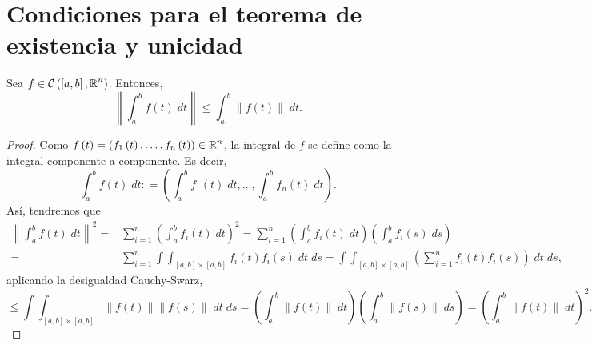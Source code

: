 \section{Condiciones para el teorema de existencia y unicidad}
\begin{lema}
	Sea $\displaystyle f \in \mathcal{C}\left(\left[a,b\right] , \mathbb{R}^{n}\right) $. Entonces,
	\[ \left\|\int^{b}_{a} f\left(t\right) \; dt\right\| \leq \int^{b}_{a} \|f\left(t\right)\| \; dt.\]
\end{lema}
\begin{proof}
Como $\displaystyle f\left(t\right)=\left(f_{1}\left(t\right), \ldots, f_{n}\left(t\right)\right)\in \mathbb{R}^{n} $, la integral de $\displaystyle f $ se define como la integral componente a componente. Es decir, 
\[\int^{b}_{a} f\left(t\right) \; dt : = \left(\int^{b}_{a} f_{1}\left(t\right) \; dt, \ldots, \int^{b}_{a} f_{n}\left(t\right) \; dt\right) .\]
Así, tendremos que 
\[
\begin{split}
	\left\|\int^{b}_{a} f\left(t\right) \; dt\right\|^{2} = & \sum^{n}_{i = 1}\left(\int^{b}_{a} f_{i}\left(t\right) \; dt\right)^{2} = \sum^{n}_{i = 1}\left(\int^{b}_{a} f_{i}\left(t\right) \; dt\right)\left(\int^{b}_{a} f_{i}\left(s\right) \; d s\right)\\
	= & \sum^{n}_{i = 1}\int \int _{\left[a,b\right]\times\left[a,b\right]}f_{i}\left(t\right)f_{i}\left(s\right) \; dt  \; d s = \int \int _{\left[a,b\right]\times\left[a,b\right]}\left(\sum^{n}_{i = 1}f_{i}\left(t\right)f_{i}\left( s\right)\right) \; dt \; d s,
\end{split}
\]
aplicando la desigualdad Cauchy-Swarz,
\[
	\leq  \int \int _{\left[a,b\right]\times\left[a,b\right]} \|f\left(t\right)\|\|f\left(s\right)\| \; dt \; d s =\left(\int^{b}_{a} \|f\left(t\right)\| \; dt\right)\left(\int^{b}_{a} \|f\left(s\right)\| \; d s\right)=\left(\int^{b}_{a} \|f\left(t\right)\| \; dt\right)^{2}.
\]
\end{proof}

